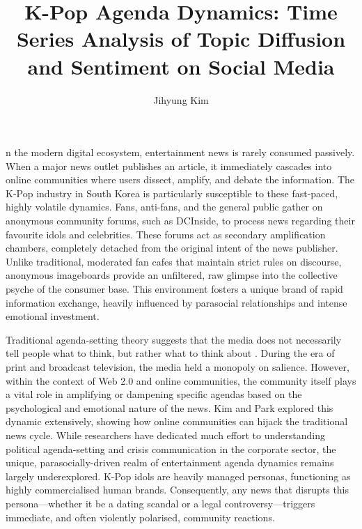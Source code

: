 \documentclass[9pt,twoside,lineno]{pnas-new}
\title{K-Pop Agenda Dynamics: Time Series Analysis of Topic Diffusion and Sentiment on Social Media}
\author{Jihyung Kim}
\begin{document}
\maketitle
\thispagestyle{firststyle}

\begin{article}

n the modern digital ecosystem, entertainment news is rarely consumed passively. When a major news outlet publishes an article, it immediately cascades into online communities where users dissect, amplify, and debate the information. The K-Pop industry in South Korea is particularly susceptible to these fast-paced, highly volatile dynamics. Fans, anti-fans, and the general public gather on anonymous community forums, such as DCInside, to process news regarding their favourite idols and celebrities. These forums act as secondary amplification chambers, completely detached from the original intent of the news publisher. Unlike traditional, moderated fan cafes that maintain strict rules on discourse, anonymous imageboards provide an unfiltered, raw glimpse into the collective psyche of the consumer base. This environment fosters a unique brand of rapid information exchange, heavily influenced by parasocial relationships and intense emotional investment.

Traditional agenda-setting theory suggests that the media does not necessarily tell people what to think, but rather what to think about \cite{agenda_setting_2006}. During the era of print and broadcast television, the media held a monopoly on salience. However, within the context of Web 2.0 and online communities, the community itself plays a vital role in amplifying or dampening specific agendas based on the psychological and emotional nature of the news. Kim and Park \cite{kim2017sewol} explored this dynamic extensively, showing how online communities can hijack the traditional news cycle. While researchers have dedicated much effort to understanding political agenda-setting and crisis communication in the corporate sector, the unique, parasocially-driven realm of entertainment agenda dynamics remains largely underexplored. K-Pop idols are heavily managed personas, functioning as highly commercialised human brands. Consequently, any news that disrupts this persona---whether it be a dating scandal or a legal controversy---triggers immediate, and often violently polarised, community reactions.


\end{article}
\end{document}

